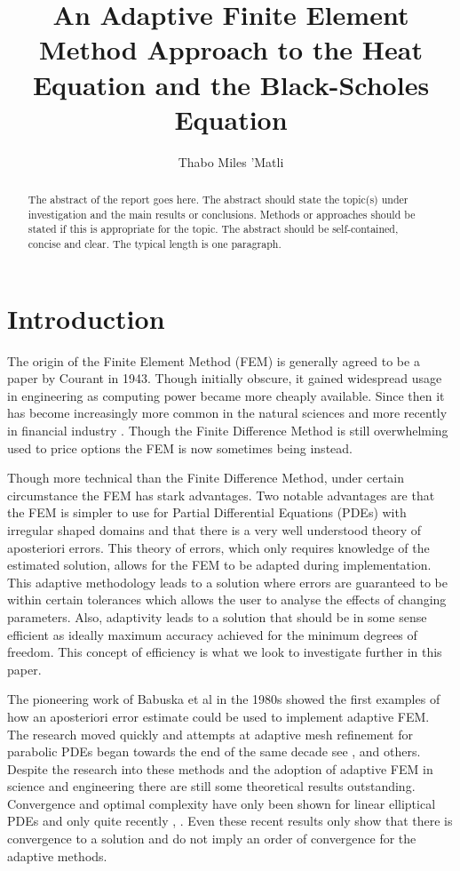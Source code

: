 \documentclass{uonmathreport}
\title{An Adaptive Finite Element Method Approach to the Heat Equation and the Black-Scholes Equation}
\author{Thabo Miles 'Matli}
\theoremstyle{definition}
\theoremstyle{problem}
\theoremstyle{theorem}
\begin{document}
\maketitle

\begin{abstract}
The abstract of the report goes here. The abstract should state the
topic(s) under investigation and the main results or
conclusions. Methods or approaches should be stated if this is
appropriate for the topic. The abstract should be self-contained,
concise and clear. The typical length is one paragraph.
\end{abstract}

\setcounter{tocdepth}{2}  %
\tableofcontents 
\newpage

\section{Introduction} \label{sec:intro}

The origin of the Finite Element Method (FEM) is generally agreed to be a paper by Courant \cite{courant1943} in 1943. Though initially obscure, it gained widespread usage in engineering as computing power became more cheaply available. Since then it has become increasingly more common in the natural sciences and more recently in financial industry \cite{topper2005option}. Though the Finite Difference Method is still overwhelming used to price options the FEM is now sometimes being instead. 

Though more technical than the Finite Difference Method, under certain circumstance the FEM has stark advantages. Two notable advantages are that the FEM is simpler to use for Partial Differential Equations (PDEs) with irregular shaped domains and that there is a very well understood theory of aposteriori errors. This theory of errors, which only requires knowledge of the estimated solution, allows for the FEM to be adapted during implementation. This adaptive methodology leads to a solution where errors are guaranteed to be within certain tolerances which allows the user to analyse the effects of changing parameters. Also, adaptivity leads to a solution that should be in some sense efficient as ideally maximum accuracy achieved for the minimum degrees of freedom. This concept of efficiency is what we look to investigate further in this paper.

The pioneering work of Babuska et al \cite{babuska1981posteriori} in the 1980s showed the first examples of how an aposteriori error estimate could be used to implement adaptive FEM. The research moved quickly and attempts at adaptive mesh refinement for parabolic PDEs began towards the end of the same decade see \cite{eriksson1991adaptive}, \cite{johnson1988error} and others. Despite the research into these methods and the adoption of adaptive FEM in science and engineering there are still some theoretical results outstanding. Convergence and optimal complexity have only been shown for linear elliptical PDEs and only quite recently \cite{morin2008basic}, \cite{siebert2011convergence}. Even these recent results only show that there is convergence to a solution and do not imply an order of convergence for the adaptive methods.
\end{document}
